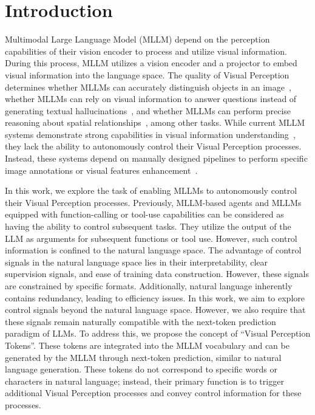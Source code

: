 \section{Introduction}
\label{sec:intro}

Multimodal Large Language Model (MLLM) depend on the perception capabilities of their vision encoder to process and utilize visual information. During this process, MLLM utilizes a vision encoder and a projector to embed visual information into the language space. The quality of Visual Perception determines whether MLLMs can accurately distinguish objects in an image~\cite{mot}, whether MLLMs can rely on visual information to answer questions instead of generating textual hallucinations~\cite{leng2024mitigating}, and whether MLLMs can perform precise reasoning about spatial relationships~\cite{cheng2024spatialrgpt}, among other tasks.
While current MLLM systems demonstrate strong capabilities in visual information understanding~\cite{gpt4mllm,gemini,Qwen2VL,llava15}, they lack the ability to autonomously control their Visual Perception processes. Instead, these systems depend on manually designed pipelines to perform specific image annotations or visual features enhancement~\cite{yu2024api,mot}. 

In this work, we explore the task of enabling MLLMs to autonomously control their Visual Perception processes. 
Previously, MLLM-based agents and MLLMs equipped with function-calling or tool-use capabilities can be considered as having the ability to control subsequent tasks. They utilize the output of the LLM as arguments for subsequent functions or tool use. However, such control information is confined to the natural language space.  
The advantage of control signals in the natural language space lies in their interpretability, clear supervision signals, and ease of training data construction. However, these signals are constrained by specific formats. Additionally, natural language inherently contains redundancy, leading to efficiency issues.  
In this work, we aim to explore control signals beyond the natural language space. However, we also require that these signals remain naturally compatible with the next-token prediction paradigm of LLMs. 
To address this, we propose the concept of ``Visual Perception Tokens''. These tokens are integrated into the MLLM vocabulary and can be generated by the MLLM through next-token prediction, similar to natural language generation. These tokens do not correspond to specific words or characters in natural language; instead, their primary function is to trigger additional Visual Perception processes and convey control information for these processes. 

